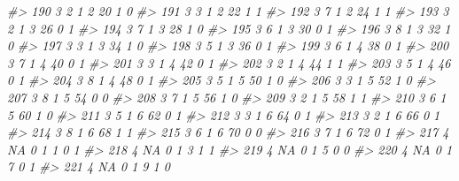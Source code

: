 \documentclass[]{book}
\newenvironment{Shaded}{\begin{snugshade}}{\end{snugshade}}
\newcommand{\CommentTok}[1]{\textcolor[rgb]{0.56,0.35,0.01}{\textit{#1}}}
\begin{document}
\begin{Shaded}
\begin{Highlighting}[]
\CommentTok{#> 190     3         2         1     2    20           1            0}
\CommentTok{#> 191     3         3         1     2    22           1            1}
\CommentTok{#> 192     3         7         1     2    24           1            1}
\CommentTok{#> 193     3         2         1     3    26           0            1}
\CommentTok{#> 194     3         7         1     3    28           1            0}
\CommentTok{#> 195     3         6         1     3    30           0            1}
\CommentTok{#> 196     3         8         1     3    32           1            0}
\CommentTok{#> 197     3         3         1     3    34           1            0}
\CommentTok{#> 198     3         5         1     3    36           0            1}
\CommentTok{#> 199     3         6         1     4    38           0            1}
\CommentTok{#> 200     3         7         1     4    40           0            1}
\CommentTok{#> 201     3         3         1     4    42           0            1}
\CommentTok{#> 202     3         2         1     4    44           1            1}
\CommentTok{#> 203     3         5         1     4    46           0            1}
\CommentTok{#> 204     3         8         1     4    48           0            1}
\CommentTok{#> 205     3         5         1     5    50           1            0}
\CommentTok{#> 206     3         3         1     5    52           1            0}
\CommentTok{#> 207     3         8         1     5    54           0            0}
\CommentTok{#> 208     3         7         1     5    56           1            0}
\CommentTok{#> 209     3         2         1     5    58           1            1}
\CommentTok{#> 210     3         6         1     5    60           1            0}
\CommentTok{#> 211     3         5         1     6    62           0            1}
\CommentTok{#> 212     3         3         1     6    64           0            1}
\CommentTok{#> 213     3         2         1     6    66           0            1}
\CommentTok{#> 214     3         8         1     6    68           1            1}
\CommentTok{#> 215     3         6         1     6    70           0            0}
\CommentTok{#> 216     3         7         1     6    72           0            1}
\CommentTok{#> 217     4        NA         0     1     1           0            1}
\CommentTok{#> 218     4        NA         0     1     3           1            1}
\CommentTok{#> 219     4        NA         0     1     5           0            0}
\CommentTok{#> 220     4        NA         0     1     7           0            1}
\CommentTok{#> 221     4        NA         0     1     9           1            0}

\end{Highlighting}
\end{Shaded}
\end{document}
